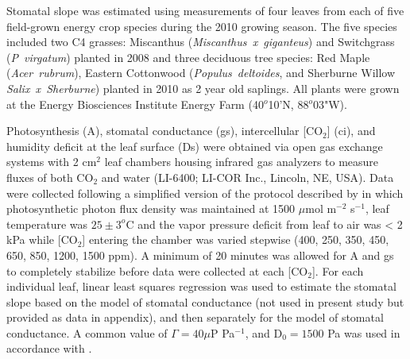\documentclass[12pt]{article}
\begin{document}
\begin{flushleft}
\begin{spacing}{1}
Stomatal slope was estimated using measurements of four leaves from each of five field-grown energy crop species during the 2010 growing season. 
The five species included two C4 grasses: Miscanthus (\textit{Miscanthus~x~giganteus}) and Switchgrass (\textit{P~virgatum}) planted in 2008 and three deciduous tree species: Red Maple (\textit{Acer~rubrum}), Eastern Cottonwood (\textit{Populus~deltoides}, and Sherburne Willow \textit{Salix~x~Sherburne}) planted in 2010 as 2 year old saplings. 
 All plants were grown at the Energy Biosciences Institute Energy Farm (40$^o$10'N, 88$^o$03"W).

Photosynthesis (A), stomatal conductance (gs), intercellular [CO$_2$] (ci), and humidity deficit at the leaf surface (Ds) were obtained via open gas exchange systems with 2 cm$^2$ leaf chambers housing infrared gas analyzers to measure fluxes of both CO$_2$ and water (LI-6400; LI-COR Inc., Lincoln, NE, USA). 
Data were collected following a simplified version of the protocol described by \citet{leakey2006ltg} in which photosynthetic photon flux density was maintained at 1500 $\mu$mol m$^{-2}$ s$^{-1}$, leaf temperature was $25 \pm 3^o$C and the vapor pressure deficit from leaf to air was < 2 kPa while [CO$_2$] entering the chamber was varied stepwise (400, 250, 350, 450, 650, 850, 1200, 1500 ppm). A minimum of 20 minutes was allowed for A and gs to completely stabilize before data were collected at each [CO$_2$]. 
 For each individual leaf, linear least squares regression was used to estimate the stomatal slope based on the \citet{ball1987mps} model of stomatal conductance (not used in present study but provided as data in appendix), and then separately for the \citet{leuning1995cac} model of stomatal conductance. A common value of $\Gamma=40 \mu$P Pa$^{-1}$, and D$_0=1500$ Pa was used in accordance with \citet{leuning1995cac}.


\end{spacing}
\end{flushleft}
\end{document}
